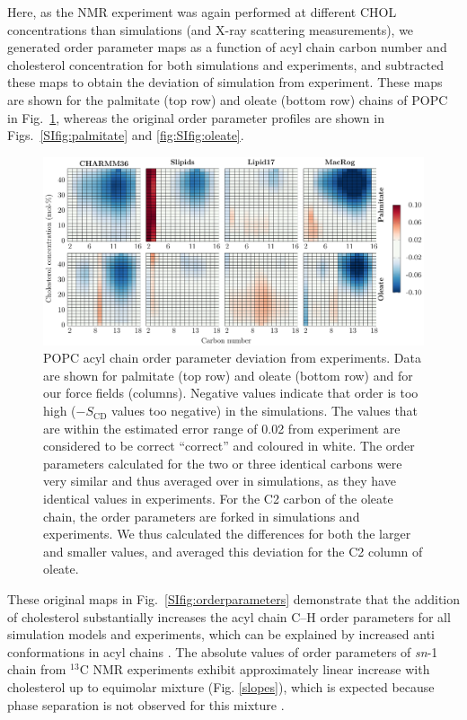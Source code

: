\documentclass[aps,prl,superscriptaddress]{revtex4-2}
\begin{document}
Here, as the NMR experiment \cite{ferreira13} was again performed at different CHOL concentrations than simulations (and X-ray scattering measurements), we generated order parameter maps as a function of acyl chain carbon number and cholesterol concentration for both simulations and experiments, and subtracted these maps to obtain the deviation of simulation from experiment. These maps are shown for the palmitate (top row) and oleate (bottom row) chains of POPC in Fig.~\ref{fig:OPmaps}, whereas the original order parameter profiles are shown in Figs.~\ref{SIfig:palmitate} and \ref{fig:SIfig:oleate}.

\begin{figure}[htb!]
  \centering
  \includegraphics[width=\linewidth]{../FIGS/OP_chains.pdf}
  \caption{\label{fig:OPmaps}%
  POPC acyl chain order parameter deviation from experiments. Data are shown for palmitate (top row) and oleate (bottom row) and for our force fields (columns). Negative values indicate that order is too high ($-S_\mathrm{CD}$ values too negative) in the simulations. The values that are within the estimated error range of 0.02 from experiment are considered to be correct ``correct'' and coloured in white. The order parameters calculated for the two or three identical carbons were very similar and thus averaged over in simulations, as they have identical values in experiments. For the C2 carbon of the oleate chain, the order parameters are forked in simulations and experiments. We thus calculated the differences for both the larger and smaller values, and averaged this deviation for the C2 column of oleate.
  }
\end{figure}

These original maps in Fig.~\ref{SIfig:orderparameters} demonstrate that the addition of cholesterol substantially increases the acyl chain C--H order parameters for all simulation models and experiments, which can be explained by increased anti conformations in acyl chains \cite{ferreira13,??}. The absolute values of order parameters of \textit{sn}-1 chain from $^{13}$C NMR experiments \cite{ferreira13}
exhibit approximately linear increase with cholesterol up to equimolar mixture (Fig. \ref{slopes}), which is expected because
phase separation is not observed for this mixture \cite{ionova12,ferreira13}.
\end{document}
